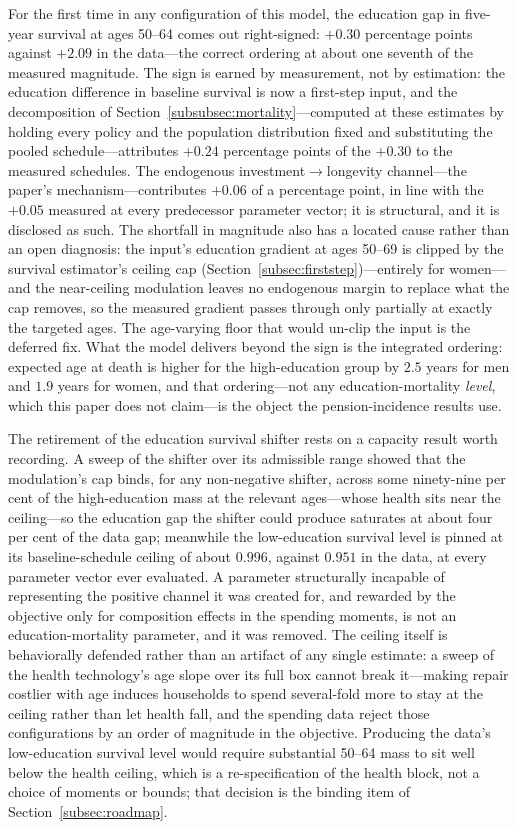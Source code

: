 \documentclass[12pt,a4paper]{article}
\begin{document}
For the first time in any configuration of this model, the education gap in five-year survival at ages 50--64 comes out right-signed: $+0.30$ percentage points against $+2.09$ in the data---the correct ordering at about one seventh of the measured magnitude. The sign is earned by measurement, not by estimation: the education difference in baseline survival is now a first-step input, and the decomposition of Section~\ref{subsubsec:mortality}---computed at these estimates by holding every policy and the population distribution fixed and substituting the pooled schedule---attributes $+0.24$ percentage points of the $+0.30$ to the measured schedules. The endogenous investment$\to$longevity channel---the paper's mechanism---contributes $+0.06$ of a percentage point, in line with the $+0.05$ measured at every predecessor parameter vector; it is structural, and it is disclosed as such. The shortfall in magnitude also has a located cause rather than an open diagnosis: the input's education gradient at ages 50--69 is clipped by the survival estimator's ceiling cap (Section~\ref{subsec:firststep})---entirely for women---and the near-ceiling modulation leaves no endogenous margin to replace what the cap removes, so the measured gradient passes through only partially at exactly the targeted ages. The age-varying floor that would un-clip the input is the deferred fix. What the model delivers beyond the sign is the integrated ordering: expected age at death is higher for the high-education group by $2.5$ years for men and $1.9$ years for women, and that ordering---not any education-mortality \emph{level}, which this paper does not claim---is the object the pension-incidence results use.

The retirement of the education survival shifter rests on a capacity result worth recording. A sweep of the shifter over its admissible range showed that the modulation's cap binds, for any non-negative shifter, across some ninety-nine per cent of the high-education mass at the relevant ages---whose health sits near the ceiling---so the education gap the shifter could produce saturates at about four per cent of the data gap; meanwhile the low-education survival level is pinned at its baseline-schedule ceiling of about $0.996$, against $0.951$ in the data, at every parameter vector ever evaluated. A parameter structurally incapable of representing the positive channel it was created for, and rewarded by the objective only for composition effects in the spending moments, is not an education-mortality parameter, and it was removed. The ceiling itself is behaviorally defended rather than an artifact of any single estimate: a sweep of the health technology's age slope over its full box cannot break it---making repair costlier with age induces households to spend several-fold more to stay at the ceiling rather than let health fall, and the spending data reject those configurations by an order of magnitude in the objective. Producing the data's low-education survival level would require substantial 50--64 mass to sit well below the health ceiling, which is a re-specification of the health block, not a choice of moments or bounds; that decision is the binding item of Section~\ref{subsec:roadmap}.
\end{document}
